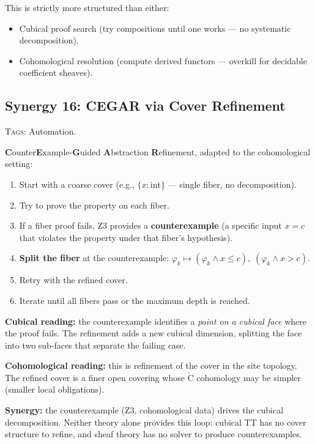 \documentclass[11pt,a4paper]{article}
\theoremstyle{definition}
\theoremstyle{plain}
\newcommand{\Cech}{\check{\mathrm{C}}}
\begin{document}
This is strictly more structured than either:
\begin{itemize}
\item Cubical proof search (try compositions until one works ---
  no systematic decomposition).
\item Cohomological resolution (compute derived functors ---
  overkill for decidable coefficient sheaves).
\end{itemize}


\subsection{Synergy 16: CEGAR via Cover Refinement}
\label{sec:syn-cegar}

\textsc{Tags:} Automation.

\medskip\noindent
\textbf{C}ounter\textbf{E}xample-\textbf{G}uided
\textbf{A}bstraction \textbf{R}efinement, adapted to the
cohomological setting:

\begin{enumerate}
\item Start with a coarse cover (e.g., $\{x : \mathrm{int}\}$
  --- single fiber, no decomposition).
\item Try to prove the property on each fiber.
\item If a fiber proof fails, Z3 provides a \textbf{counterexample}
  (a specific input $x = c$ that violates the property under that
  fiber's hypothesis).
\item \textbf{Split the fiber} at the counterexample:
  $\varphi_k \mapsto (\varphi_k \wedge x \leq c),\;
  (\varphi_k \wedge x > c)$.
\item Retry with the refined cover.
\item Iterate until all fibers pass or the maximum depth is reached.
\end{enumerate}

\textbf{Cubical reading:} the counterexample identifies a
\emph{point on a cubical face} where the proof fails.  The
refinement adds a new cubical dimension, splitting the face into
two sub-faces that separate the failing case.

\textbf{Cohomological reading:} this is refinement of the cover
in the site topology.  The refined cover is a finer open covering
whose $\Cech$ cohomology may be simpler (smaller local obligations).

\textbf{Synergy:} the counterexample (Z3, cohomological data)
drives the cubical decomposition.  Neither theory alone provides
this loop: cubical TT has no cover structure to refine, and sheaf
theory has no solver to produce counterexamples.
\end{document}
